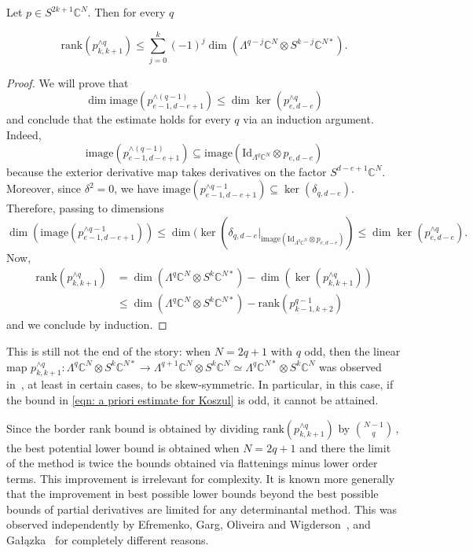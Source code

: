 \documentclass{toc}
\newcommand{\bbC}{\mathbb{C}}
\newcommand{\Id}{\mathrm{Id}}
\def\BC{\mathbb C}
\def\ww{\wedge}
\def\La#1{\Lambda^{#1}}
\def\tdim{\operatorname{dim}}
\def\trank{\mathrm{rank}}
\def\tim{\mathrm{image}}
\begin{document}
\begin{proposition}\label{kozapriori} Let $p\in S^{2k+1}\BC^N$. Then for every $q$

\begin{equation}\label{eqn: a priori estimate for Koszul}
\trank(p^{\ww q}_{k,k+1})\leq \sum_{j=0}^k (-1)^j\tdim ( \La{q-j}\BC^N \otimes S^{k-j}\BC^{N*}).
\end{equation}
\end{proposition}
\begin{proof}
We will prove that 
\[
\dim \tim (p^{\wedge(q-1)}_{e-1,d-e+1}) \leq \dim \ker (p^{\wedge q}_{e,d-e}) 
\]
and conclude that the estimate holds for every $q$ via an induction argument. Indeed,
\[
  \tim \left(p^{\wedge (q-1)}_{e-1,d-e+1}\right) \subseteq \tim (\Id_{\Lambda^{q} \bbC^N} \otimes p_{e,d-e})
\]
because the exterior derivative map takes derivatives on the factor
$S^{d-e+1} \bbC^N$. Moreover, since $\delta^2 = 0$, we have
$\tim (p^{\wedge q-1}_{e-1,d-e+1}) \subseteq
\ker(\delta_{q,d-e})$. Therefore, passing to dimensions
\[
\dim (\tim (p^{\wedge q-1}_{e-1,d-e+1})) \leq \dim ( \ker(\delta_{q,d-e} \vert_{\tim (\Id_{\Lambda^{q} \bbC^N} \otimes p_{e,d-e})}) \leq \dim \ker (p^{\wedge q}_{e,d-e}).
\]
Now,
\begin{align*} 
\trank(p^{\ww q}_{k,k+1}) &= \dim  (\La{q}\BC^N \otimes S^{k}\BC^{N*} ) - \dim (\ker (p^{\ww q}_{k,k+1}))   \\ 
  & \leq  \tdim (\La{q}\BC^N \otimes S^{k}\BC^{N*}) - \trank (p^{q-1}_{k-1,k+2}) 
\end{align*}
and we conclude by induction.
\end{proof}

\begin{remark}\label{rmk: skewsymmetric koszul}
This is still not the end of the story:  when $N=2q+1$ with $q$ odd, then the linear map $p^{\ww q}_{k,k+1}: \La q \BC^N \otimes  S^k\BC^{N*} \to \La{q+1}\BC^N  \otimes S^{k}\BC^N \simeq  \La{q}\BC^{N*} \otimes S^k\BC^N$ was observed in~\cite{MR3081636}, at least in certain cases, to be skew-symmetric. In particular, in this case,  if the bound in \eqref{eqn: a priori estimate for Koszul} is odd, it cannot be attained. 
\end{remark}

\begin{remark}
Since the border rank bound is obtained by dividing $\trank(p^{\ww q}_{k,k+1})$ by $\binom{N-1}q$\,, the best potential lower bound is obtained when $N=2q+1$ and there the limit of the method is   twice the bounds obtained via flattenings minus lower order terms. This improvement is irrelevant for complexity. It is known more generally that the improvement in best possible lower bounds beyond the best possible bounds of partial derivatives are limited for any determinantal method. This was observed independently by Efremenko, Garg, Oliveira and Wigderson~\cite{EfrGarOliWig:BarriersRankMethods}, and Ga{\l}\k{a}zka~\cite{2016arXiv160508005G} for completely different reasons.
\end{remark}
\end{document}
